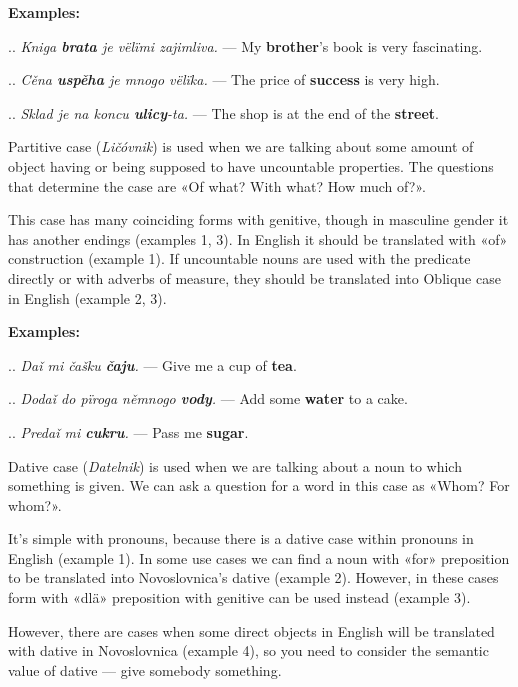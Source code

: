 \textbf{Examples:}

.. \textit{Kniga \textbf{brata} je vëlïmi zajimliva.} — My \textbf{brother}'s book is very fascinating.

.. \textit{Cěna \textbf{uspěha} je mnogo vëlïka.} — The price of \textbf{success} is very high.

.. \textit{Sklad je na koncu \textbf{ulicy}-ta.} — The shop is at the end of the \textbf{street}.

Partitive case (\textit{Ličóvnik}) is used when we are talking about some amount of object having or being supposed to have uncountable properties. The questions that determine the case are «Of what? With what? How much of?».

This case has many coinciding forms with genitive, though in masculine gender it has another endings (examples 1, 3). In English it should be translated with «of» construction (example 1). If uncountable nouns are used with the predicate directly or with adverbs of measure, they should be translated into Oblique case in English (example 2, 3).

\textbf{Examples:}

.. \textit{Daǐ mi čašku \textbf{čaju}.} — Give me a cup of \textbf{tea}.

.. \textit{Dodaǐ do pïroga němnogo \textbf{vody}.} — Add some \textbf{water} to a cake.

.. \textit{Predaǐ mi \textbf{cukru}.} — Pass me \textbf{sugar}.

Dative case (\textit{Datelnik}) is used when we are talking about a noun to which something is given. We can ask a question for a word in this case as «Whom? For whom?».

It's simple with pronouns, because there is a dative case within pronouns in English (example 1). In some use cases we can find a noun with «for» preposition to be translated into Novoslovnica's dative (example 2). However, in these cases form with «dlä» preposition with genitive can be used instead (example 3).

However, there are cases when some direct objects in English will be translated with dative in Novoslovnica (example 4), so you need to consider the semantic value of dative — give somebody something.

